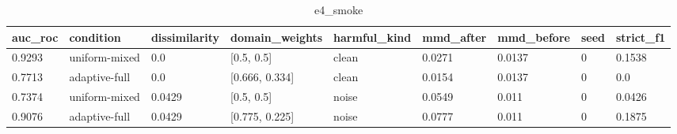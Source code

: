 \begin{table}[h]
\centering
\caption{e4_smoke}
\label{tab:e4_smoke}
\begin{tabular}{lllllllll}
\toprule
auc\_roc & condition & dissimilarity & domain\_weights & harmful\_kind & mmd\_after & mmd\_before & seed & strict\_f1 \\
\midrule
0.9293 & uniform-mixed & 0.0 & [0.5, 0.5] & clean & 0.0271 & 0.0137 & 0 & 0.1538 \\
0.7713 & adaptive-full & 0.0 & [0.666, 0.334] & clean & 0.0154 & 0.0137 & 0 & 0.0 \\
0.7374 & uniform-mixed & 0.0429 & [0.5, 0.5] & noise & 0.0549 & 0.011 & 0 & 0.0426 \\
0.9076 & adaptive-full & 0.0429 & [0.775, 0.225] & noise & 0.0777 & 0.011 & 0 & 0.1875 \\
\bottomrule
\end{tabular}
\end{table}

